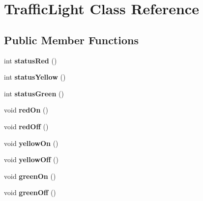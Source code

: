 \hypertarget{classTrafficLight}{\section{Traffic\-Light Class Reference}
\label{classTrafficLight}
}
\subsection*{Public Member Functions}
\begin{DoxyCompactItemize}
\item 
\hypertarget{classTrafficLight_abe5851461f1a78fcdaf845eccb3815cb}{int {\bfseries status\-Red} ()}\label{classTrafficLight_abe5851461f1a78fcdaf845eccb3815cb}

\item 
\hypertarget{classTrafficLight_a70be96340b4b25d3a638e5f290606887}{int {\bfseries status\-Yellow} ()}\label{classTrafficLight_a70be96340b4b25d3a638e5f290606887}

\item 
\hypertarget{classTrafficLight_a6abb2ec2fc47d8ef7abc38cd7e1ce1e4}{int {\bfseries status\-Green} ()}\label{classTrafficLight_a6abb2ec2fc47d8ef7abc38cd7e1ce1e4}

\item 
\hypertarget{classTrafficLight_a2cb443a633011acc36f147bfb96a01c8}{void {\bfseries red\-On} ()}\label{classTrafficLight_a2cb443a633011acc36f147bfb96a01c8}

\item 
\hypertarget{classTrafficLight_acef2029900662056507e42ffebef6df3}{void {\bfseries red\-Off} ()}\label{classTrafficLight_acef2029900662056507e42ffebef6df3}

\item 
\hypertarget{classTrafficLight_a1d97dcc2d58b2c0f08fab2eb2b902b32}{void {\bfseries yellow\-On} ()}\label{classTrafficLight_a1d97dcc2d58b2c0f08fab2eb2b902b32}

\item 
\hypertarget{classTrafficLight_a215cb8496fb1f3c05a0d88becc196cd9}{void {\bfseries yellow\-Off} ()}\label{classTrafficLight_a215cb8496fb1f3c05a0d88becc196cd9}

\item 
\hypertarget{classTrafficLight_a54e92a2b3dfb4fa8232b98d045615440}{void {\bfseries green\-On} ()}\label{classTrafficLight_a54e92a2b3dfb4fa8232b98d045615440}

\item 
\hypertarget{classTrafficLight_ae0742cdeaabe4a54edc4b69647f7f59e}{void {\bfseries green\-Off} ()}\label{classTrafficLight_ae0742cdeaabe4a54edc4b69647f7f59e}

\end{DoxyCompactItemize}
